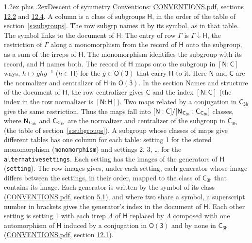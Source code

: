 \documentclass[10pt,a4paper]{article}
\makeatletter
\renewcommand\section{\@startsection{section}{1}{\z@}{-3ex plus -1ex minus -.2ex}%
  {1.2ex plus .2ex}{\normalfont\large\sffamily\bfseries\color{parttitle}}}
\numberwithin{equation}{section}
\newcommand{\grp}[1]{\mathsf{#1}}
\newcommand{\grpindex}[2]{[#1 : #2]}
\newcommand{\restr}[2]{#1\!\downarrow#2}
\newcommand{\hairsp}{\mkern1mu}
\makeatother
\begin{document}
\section{Descent of symmetry}\label{s:subduction}
Conventions: \href{../../CONVENTIONS.pdf}{CONVENTIONS.pdf}, sections \href{../../CONVENTIONS.pdf\#conv.12.2}{12.2} and \href{../../CONVENTIONS.pdf\#conv.12.4}{12.4}.
A column is a class of subgroups $\grp{H}$, in the order of the table of section~\ref{s:subgroups}. The row subgrp names it by its symbol, as in that table. The symbol links to the document of $\grp{H}$. The entry of row $\Gamma$ is $\restr{\Gamma}{\grp{H}}$, the restriction of $\Gamma$ along a monomorphism from the record of $\grp{H}$ onto the subgroup, as a sum of the irreps of $\grp{H}$. The monomorphism identifies the subgroup with its record, and $\grp{H}$ names both. \label{n:group.normalizer.o3}\label{n:group.centralizer.o3}The record of $\grp{H}$ maps onto the subgroup in $\grpindex{\grp{N}}{\grp{C}}$ ways, $h \mapsto g h g^{-1}$ ($h \in \grp{H}$) for the $g \in \grp{O(3)}$ that carry $\grp{H}$ to it. Here $\grp{N}$ and $\grp{C}$ are the normalizer and centralizer of $\grp{H}$ in \href{O3.pdf}{$\grp{O(3)}$}. In the section Names and structure of the document of $\grp{H}$, the row centralizer gives $\grp{C}$ and the index $\grpindex{\grp{N}}{\grp{C}}$ (the index in the row normalizer is $\grpindex{\grp{N}}{\grp{H}}$). Two maps related by a conjugation in $\grp{C_{3h}}$ give the same restriction. Thus the maps fall into $\grpindex{\grp{N}}{\grp{C}}/\grpindex{\grp{N}_{\hairsp \grp{C_{3h}}}}{\grp{C}_{\hairsp \grp{C_{3h}}}}$ classes, where $\grp{N}_{\hairsp \grp{C_{3h}}}$ and $\grp{C}_{\hairsp \grp{C_{3h}}}$ are the normalizer and centralizer of the subgroup in $\grp{C_{3h}}$ (the table of section~\ref{s:subgroups}). \label{n:head.setting}A subgroup whose classes of maps give different tables has one column for each table: setting 1 for the stored monomorphism (\texttt{monomorphism}) and settings 2, 3, \dots{} for the \texttt{alternativesettings}. Each setting has the images of the generators of $\grp{H}$ (\texttt{setting}). \label{n:head.images}The row images gives, under each setting, each generator whose image differs between the settings, in their order, mapped to the class of $\grp{C_{3h}}$ that contains its image. Each generator is written by the symbol of its class (\href{../../CONVENTIONS.pdf}{CONVENTIONS.pdf}, section \href{../../CONVENTIONS.pdf\#conv.5.1}{5.1}), and where two share a symbol, a superscript number in brackets gives the generator's index in the document of $\grp{H}$. \label{n:irrep.Delta}Each other setting is setting 1 with each irrep $\Lambda$ of $\grp{H}$ replaced by $\Lambda$ composed with one automorphism of $\grp{H}$ induced by a conjugation in \href{O3.pdf}{$\grp{O(3)}$} and by none in $\grp{C_{3h}}$ (\href{../../CONVENTIONS.pdf}{CONVENTIONS.pdf}, section \href{../../CONVENTIONS.pdf\#conv.12.1}{12.1}).
\end{document}
